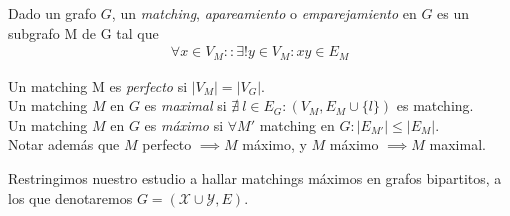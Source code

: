 \begin{definition}
Dado un grafo $G$, un \emph{matching}, \emph{apareamiento} o \emph{emparejamiento} en $G$ es un subgrafo M de G tal que 
\begin{align}
    \forall x\in V_M :: \exists! y\in V_M : xy \in E_M
\end{align}
\end{definition}

\begin{definition}
Un matching M es \emph{perfecto} si $\left| V_M \right| = \left| V_G \right|$.\\
Un matching $M$ en $G$ es \emph{maximal} si $\nexists~ l \in E_G : (V_M, E_M \cup \{l\})$ es matching.\\
Un matching $M$ en $G$ es \emph{máximo} si $\forall M'$ matching en $G : |E_{M'}| \le |E_M|$.\\
Notar además que $M$ perfecto $\implies M$ máximo, y $M$ máximo $\implies M$ maximal.
\end{definition}

Restringimos nuestro estudio a hallar matchings máximos en grafos bipartitos, a los que denotaremos $G = (\mathcal{X} \cup \mathcal{Y}, E)$.


